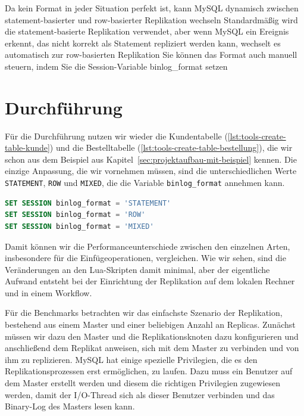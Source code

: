 Da kein Format in jeder Situation perfekt ist, kann MySQL dynamisch zwischen statement-basierter und row-basierter Replikation wechseln
Standardmäßig wird die statement-basierte Replikation verwendet, aber wenn MySQL ein Ereignis erkennt, das nicht korrekt als Statement repliziert werden kann, wechselt es automatisch zur row-basierten Replikation
Sie können das Format auch manuell steuern, indem Sie die Session-Variable binlog\_format setzen

\section{Durchführung}\label{sec:replication-durchfuhrung}

Für die Durchführung nutzen wir wieder die Kundentabelle (\ref{lst:tools-create-table-kunde}) und die Bestelltabelle (\ref{lst:tools-create-table-bestellung}), die wir schon aus dem Beispiel aus Kapitel~\ref{sec:projektaufbau-mit-beispiel} kennen.
Die einzige Anpassung, die wir vornehmen müssen, sind die unterschiedlichen Werte \texttt{STATEMENT}, \texttt{ROW} und \texttt{MIXED}, die die Variable \texttt{binlog\_format} annehmen kann.

\vspace{-5pt}
\begin{lstlisting}[language=SQL,caption=Unterschiedliche Formatimplementationen,label={lst:repl_change_format}]
SET SESSION binlog_format = 'STATEMENT'
SET SESSION binlog_format = 'ROW'
SET SESSION binlog_format = 'MIXED'
\end{lstlisting}
\vspace{-5pt}

Damit können wir die Performanceunterschiede zwischen den einzelnen Arten, insbesondere für die Einfügeoperationen, vergleichen.
Wie wir sehen, sind die Veränderungen an den Lua-Skripten damit minimal, aber der eigentliche Aufwand entsteht bei der Einrichtung der Replikation auf dem lokalen Rechner und in einem Workflow.

Für die Benchmarks betrachten wir das einfachste Szenario der Replikation, bestehend aus einem Master und einer beliebigen Anzahl an Replicas.
Zunächst müssen wir dazu den Master und die Replikationsknoten dazu konfigurieren und anschließend dem Replikat anweisen, sich mit dem Master zu verbinden und von ihm zu replizieren.
MySQL hat einige spezielle Privilegien, die es den Replikationsprozessen erst ermöglichen, zu laufen.
Dazu muss ein Benutzer auf dem Master erstellt werden und diesem die richtigen Privilegien zugewiesen werden, damit der I/O-Thread sich als dieser Benutzer verbinden und das Binary-Log des Masters lesen kann.

